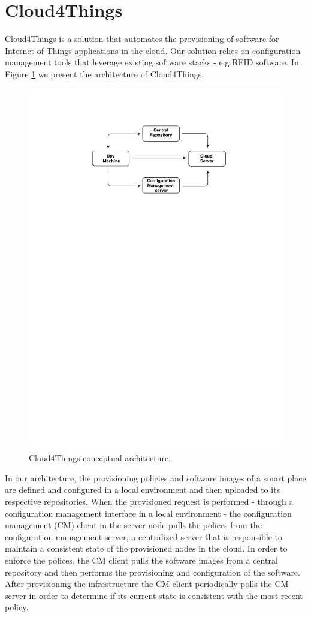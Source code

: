 \section{Cloud4Things}
\label{sec:solution}
Cloud4Things is a solution that automates the provisioning of software for Internet of Things
applications in the cloud. Our solution relies on configuration management tools that leverage
existing software stacks - e.g RFID software. In Figure \ref{fig:c4t_architecture} we present
the architecture of Cloud4Things.
\begin{figure}[!ht]
  \centering
  \includegraphics[width=.7\textwidth]{images/c4t-generic-solution.pdf}
  \caption{Cloud4Things conceptual architecture.}
  \label{fig:c4t_architecture}
\end{figure}

In our architecture, the provisioning policies and software images of a smart place are defined and configured
in a local environment and then uploaded to its respective repositories. When the provisioned request
is performed - through a configuration management interface in a local environment - the configuration
management (CM) client in the server node pulls the polices from the configuration management server,
a centralized server that is responsible to maintain a consistent state of the provisioned nodes in
the cloud. In order to enforce the polices, the CM client pulls the software images from a central
repository and then performs the provisioning and configuration of the software. After provisioning
the infrastructure the CM client periodically polls the CM server in order to determine if its current
state is consistent with the most recent policy.

